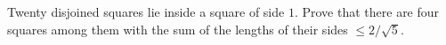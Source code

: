 Twenty disjoined squares lie inside a square of side $1$. Prove that there are four squares among them with the sum of the lengths of their sides $\leq 2/\sqrt{5}$.
